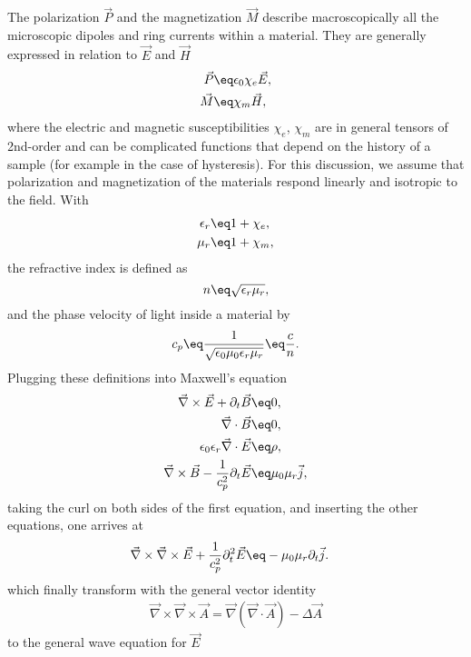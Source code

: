 \documentclass[\main/dresen_thesis.tex]{subfiles}
\begin{document}
The polarization $\vec{P}$ and the magnetization $\vec{M}$ describe macroscopically all the microscopic dipoles and ring currents within a material.
They are generally expressed in relation to $\vec{E}$ and $\vec{H}$
\begin{align}
  \vec{P} \eq& \epsilon_0 \chi_e \vec{E},\\
  \vec{M} \eq& \chi_m \vec{H},
\end{align}
where the electric and magnetic susceptibilities $\chi_e$, $\chi_m$ are in general tensors of 2nd-order and can be complicated functions that depend on the history of a sample (for example in the case of hysteresis).
For this discussion, we assume that polarization and magnetization of the materials respond linearly and isotropic to the field.
With
\begin{align}
  \epsilon_r \eq& 1 + \chi_e,\\
  \mu_r \eq& 1 + \chi_m,
\end{align}
the refractive index is defined as
\begin{equation}
  n \eq \sqrt{\epsilon_r \mu_r},
\end{equation}
and the phase velocity of light inside a material by
\begin{equation}
  c_p \eq \frac{1}{\sqrt{\epsilon_0 \mu_0 \epsilon_r \mu_r}} \eq \frac{c}{n}.
\end{equation}
Plugging these definitions into Maxwell's equation
\begin{align}
  \vec{\nabla} \times \vec{E} + \partial_t \vec{B} \eq& 0,\\
  \vec{\nabla} \cdot \vec{B} \eq& 0,\\
  \epsilon_0 \epsilon_r \vec{\nabla} \cdot \vec{E}  \eq& \rho,\\
  \vec{\nabla} \times \vec{B} - \frac{1}{c_p^2} \partial_t \vec{E} \eq& \mu_0 \mu_r \vec{j},
\end{align}
taking the curl on both sides of the first equation, and inserting the other equations, one arrives at
\begin{align}
  \vec{\nabla} \times \vec{\nabla} \times \vec{E} + \frac{1}{c_p^2}\partial_t^2  \vec{E} \eq& - \mu_0 \mu_r \partial_t \vec{j}.
\end{align}
which finally transform with the general vector identity
\begin{align}
  \vec{\nabla} \times \vec{\nabla} \times \vec{A} = \vec{\nabla} (\vec{\nabla} \cdot \vec{A}) - \Delta \vec{A}
\end{align}
to the general wave equation for $\vec{E}$
\end{document}
